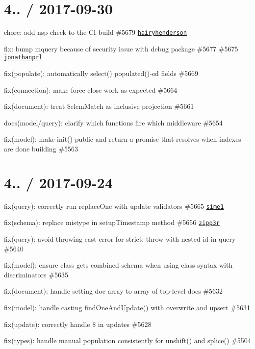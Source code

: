 \section*{4.. / 2017-\/09-\/30 }


\begin{DoxyItemize}
\item chore\+: add nsp check to the CI build \#5679 \href{https://github.com/hairyhenderson}{\tt hairyhenderson}
\item fix\+: bump mquery because of security issue with debug package \#5677 \#5675 \href{https://github.com/jonathanprl}{\tt jonathanprl}
\item fix(populate)\+: automatically select() populated()-\/ed fields \#5669
\item fix(connection)\+: make force close work as expected \#5664
\item fix(document)\+: treat \$elem\+Match as inclusive projection \#5661
\item docs(model/query)\+: clarify which functions fire which middleware \#5654
\item fix(model)\+: make {\ttfamily init()} public and return a promise that resolves when indexes are done building \#5563
\end{DoxyItemize}

\section*{4.. / 2017-\/09-\/24 }


\begin{DoxyItemize}
\item fix(query)\+: correctly run replace\+One with update validators \#5665 \href{https://github.com/sime1}{\tt sime1}
\item fix(schema)\+: replace mistype in setup\+Timestamp method \#5656 \href{https://github.com/zipp3r}{\tt zipp3r}
\item fix(query)\+: avoid throwing cast error for strict\+: throw with nested id in query \#5640
\item fix(model)\+: ensure class gets combined schema when using class syntax with discriminators \#5635
\item fix(document)\+: handle setting doc array to array of top-\/level docs \#5632
\item fix(model)\+: handle casting find\+One\+And\+Update() with overwrite and upsert \#5631
\item fix(update)\+: correctly handle \$ in updates \#5628
\item fix(types)\+: handle manual population consistently for unshift() and splice() \#5504
\end{DoxyItemize}

